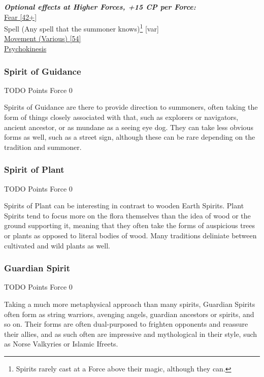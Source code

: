 \begin{multicols*}{3}
	\textbf{\textit{Optional effects at Higher Forces, +15 CP per Force:\\}}
	\hyperref[fear]{Fear [42+]}\\
	Spell (Any spell that the summoner knows)\footnote{Spirits rarely cast at a Force above their magic, although they can.} [var]\\
	\hyperref[movement]{Movement (Various) [54]}\\
	\hyperref[psychokinesis]{Psychokinesis}\\
	
	
	\subsubsection{Spirit of Guidance}
	\begin{flushright}
		TODO Points Force 0
	\end{flushright}
	
	Spirits of Guidance are there to provide direction to summoners, often taking the form of things closely associated with that, such as explorers or navigators, ancient ancestor, or as mundane as a seeing eye dog. They can take less obvious forms as well, such as a street sign, although these can be rare depending on the tradition and summoner.
	
	\subsubsection{Spirit of Plant}
	\begin{flushright}
		TODO Points Force 0
	\end{flushright}
	
	Spirits of Plant can be interesting in contrast to wooden Earth Spirits. Plant Spirits tend to focus more on the flora themselves than the idea of wood or the ground supporting it, meaning that they often take the forms of auspicious trees or plants as opposed to literal bodies of wood. Many traditions deliniate between cultivated and wild plants as well.
	
	\subsubsection{Guardian Spirit}
	\begin{flushright}
		TODO Points Force 0
	\end{flushright}
	
	Taking a much more metaphysical approach than many spirits, Guardian Spirits often form as string warriors, avenging angels, guardian ancestors or spirits, and so on. Their forms are often dual-purposed to frighten opponents and reassure their allies, and as such often are impressive and mythological in their style, such as Norse Valkyries or Islamic Ifreets.
	

\end{multicols*}

